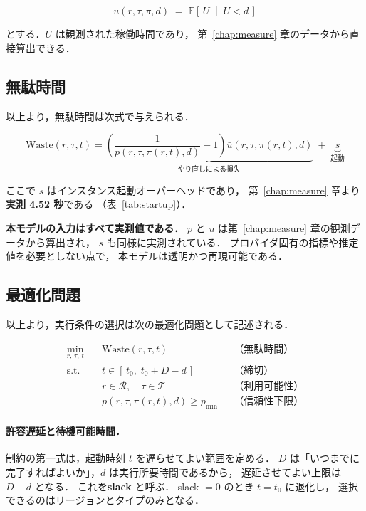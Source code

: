 \documentclass[11pt,a4paper]{ltjsreport}
\newcommand{\E}{\mathbb{E}}
\newcommand{\Waste}{\mathrm{Waste}}
\begin{document}
\begin{equation}
\bar u(r,\tau,\pi,d) \;=\; \E\!\left[\,U \;\middle|\; U < d\,\right]
\label{eq:ubar}
\end{equation}

とする．$U$ は観測された稼働時間であり，
第~\ref{chap:measure} 章のデータから直接算出できる．

\subsection{無駄時間}

以上より，無駄時間は次式で与えられる．

\begin{equation}
\boxed{\;
\Waste(r,\tau,t)
=
\underbrace{\left( \frac{1}{p(r,\tau,\pi(r,t),d)} - 1 \right)
            \bar u(r,\tau,\pi(r,t),d)}_{\text{やり直しによる損失}}
\;+\;
\underbrace{s}_{\text{起動}}
\;}
\label{eq:waste}
\end{equation}

ここで $s$ はインスタンス起動オーバーヘッドであり，
第~\ref{chap:measure} 章より\textbf{実測 4.52 秒}である
（表~\ref{tab:startup}）．

\textbf{本モデルの入力はすべて実測値である．}
$p$ と $\bar u$ は第~\ref{chap:measure} 章の観測データから算出され，
$s$ も同様に実測されている．
プロバイダ固有の指標や推定値を必要としない点で，
本モデルは透明かつ再現可能である．

\subsection{最適化問題}

以上より，実行条件の選択は次の最適化問題として記述される．

\begin{equation}
\begin{aligned}
\min_{r,\,\tau,\,t}\quad
  & \Waste(r,\tau,t) && \text{（無駄時間）} \\[3pt]
\text{s.t.}\quad
  & t \in [\,t_0,\; t_0 + D - d\,] && \text{（締切）} \\[2pt]
  & r \in \mathcal{R},\quad \tau \in \mathcal{T} && \text{（利用可能性）} \\[2pt]
  & p(r,\tau,\pi(r,t),d) \geq p_{\min} && \text{（信頼性下限）}
\end{aligned}
\label{eq:opt}
\end{equation}

\paragraph{許容遅延と待機可能時間．}
制約の第一式は，起動時刻 $t$ を遅らせてよい範囲を定める．
$D$ は「いつまでに完了すればよいか」，$d$ は実行所要時間であるから，
遅延させてよい上限は $D - d$ となる．
これを\textbf{slack} と呼ぶ．
slack $= 0$ のとき $t = t_0$ に退化し，
選択できるのはリージョンとタイプのみとなる．
\end{document}
